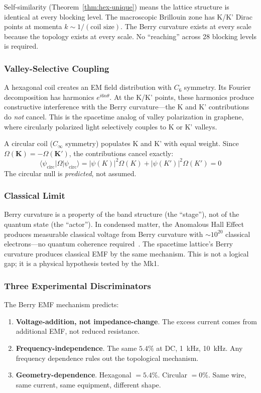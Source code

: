 \documentclass[12pt,a4paper]{article}
\theoremstyle{plain}
\theoremstyle{definition}
\begin{document}
Self-similarity (Theorem~\ref{thm:hex-unique}) means the lattice structure is identical at every blocking level. The macroscopic Brillouin zone has K/K' Dirac points at momenta $k \sim 1/(\text{coil size})$. The Berry curvature exists at every scale because the topology exists at every scale. No ``reaching'' across 28 blocking levels is required.

\subsubsection{Valley-Selective Coupling}

A hexagonal coil creates an EM field distribution with $C_6$ symmetry. Its Fourier decomposition has harmonics $e^{i6n\theta}$. At the K/K' points, these harmonics produce constructive interference with the Berry curvature---the K and K' contributions do \emph{not} cancel. This is the spacetime analog of valley polarization in graphene, where circularly polarized light selectively couples to K or K' valleys.

A circular coil ($C_\infty$ symmetry) populates K and K' with equal weight. Since $\Omega(\mathbf{K}) = -\Omega(\mathbf{K}')$, the contributions cancel exactly:
\begin{equation}
\langle\psi_{\mathrm{circ}}|\Omega|\psi_{\mathrm{circ}}\rangle = |\psi(K)|^2\Omega(K) + |\psi(K')|^2\Omega(K') = 0
\end{equation}
The circular null is \emph{predicted}, not assumed.

\subsubsection{Classical Limit}

Berry curvature is a property of the band structure (the ``stage''), not of the quantum state (the ``actor''). In condensed matter, the Anomalous Hall Effect produces measurable classical voltage from Berry curvature with $\sim 10^{20}$ classical electrons---no quantum coherence required~\cite{Xiao2010}. The spacetime lattice's Berry curvature produces classical EMF by the same mechanism. This is not a logical gap; it is a physical hypothesis tested by the Mk1.

\subsubsection{Three Experimental Discriminators}

The Berry EMF mechanism predicts:
\begin{enumerate}[nosep]
    \item \textbf{Voltage-addition, not impedance-change}. The excess current comes from additional EMF, not reduced resistance.
    \item \textbf{Frequency-independence}. The same $5.4\%$ at DC, 1~kHz, 10~kHz. Any frequency dependence rules out the topological mechanism.
    \item \textbf{Geometry-dependence}. Hexagonal $= 5.4\%$. Circular $= 0\%$. Same wire, same current, same equipment, different shape.
\end{enumerate}
\end{document}

